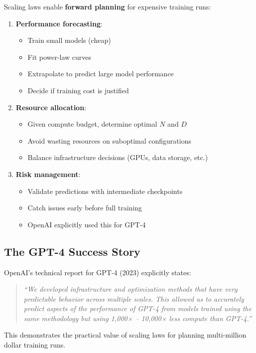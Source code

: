 \documentclass{article}
\begin{document}
Scaling laws enable \textbf{forward planning} for expensive training runs:

\begin{enumerate}
\item \textbf{Performance forecasting}:
\begin{itemize}
\item Train small models (cheap)
\item Fit power-law curves
\item Extrapolate to predict large model performance
\item Decide if training cost is justified
\end{itemize}

\item \textbf{Resource allocation}:
\begin{itemize}
\item Given compute budget, determine optimal $N$ and $D$
\item Avoid wasting resources on suboptimal configurations
\item Balance infrastructure decisions (GPUs, data storage, etc.)
\end{itemize}

\item \textbf{Risk management}:
\begin{itemize}
\item Validate predictions with intermediate checkpoints
\item Catch issues early before full training
\item OpenAI explicitly used this for GPT-4
\end{itemize}
\end{enumerate}

\subsection{The GPT-4 Success Story}

OpenAI's technical report for GPT-4 (2023) explicitly states:

\begin{quote}
\textit{``We developed infrastructure and optimization methods that have very predictable behavior across multiple scales. This allowed us to accurately predict aspects of the performance of GPT-4 from models trained using the same methodology but using 1,000× -- 10,000× less compute than GPT-4.''}
\end{quote}

This demonstrates the practical value of scaling laws for planning multi-million dollar training runs.
\end{document}
